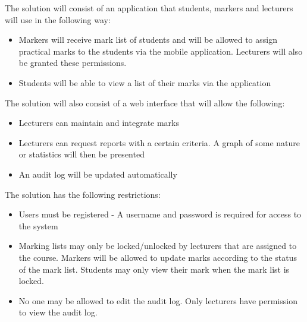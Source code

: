 \documentclass[12pt]{article}
\begin{document}
		\vspace{0.1in}
		
		\begin{flushleft}
			The solution will consist of an application that students, markers and lecturers will use in the following way:
		\end{flushleft}
		
		\begin{itemize}
			\item Markers will receive mark list of students and will be allowed to assign practical marks to the students via the mobile application. Lecturers will also be granted these permissions.
			\item Students will be able to view a list of their marks via the application
		\end{itemize}
		
		\vspace{0.1in}
		
		\begin{flushleft}
			The solution will also consist of a web interface that will allow the following:
		\end{flushleft}
		
		\begin{itemize}
			\item Lecturers can maintain and integrate marks
			\item Lecturers can request reports with a certain criteria. A graph of some nature or statistics will then be presented 
			\item An audit log will be updated automatically 
		\end{itemize}
		
		\vspace{0.1in}
		
		\begin{flushleft}
			The solution has the following restrictions:
		\end{flushleft}
		
		\begin{itemize}
			\item Users must be registered - A username and password is required for access to the system
			\item Marking lists may only be locked/unlocked by lecturers that are assigned to the course. Markers will be allowed to update marks according to the status of the mark list. Students may only view their mark when the mark list is locked.
			\item No one may be allowed to edit the audit log. Only lecturers have permission to view the audit log. 
		\end{itemize}
\end{document}

